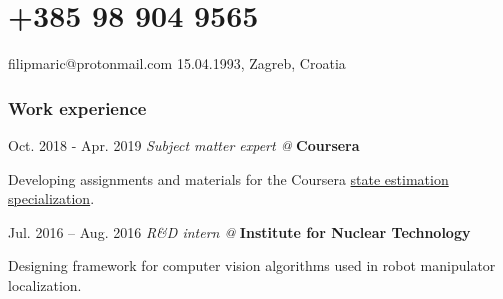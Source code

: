 \documentclass{tccv}
\begin{document}
\part
    [hr.linkedin.com/in/filipmrc]
    {+385 98 904 9565}   
    {filipmaric@protonmail.com}
    {15.04.1993, Zagreb, Croatia} 
 
       
\section{Work experience} 
 
\begin{eventlist}


\item{Oct. 2018 - Apr. 2019}
     {\textit{Subject matter expert @} \textbf{Coursera}}  

     Developing assignments and materials for the Coursera \href{https://www.coursera.org/learn/state-estimation-localization-self-driving-cars}{state estimation specialization}. 

\item{Jul. 2016 -- Aug. 2016}    
     {\textit{R\&D intern @} \textbf{Institute for Nuclear Technology}}
     
     Designing framework for computer vision algorithms used in robot manipulator localization.
  
%       
\end{eventlist}
\end{document}
